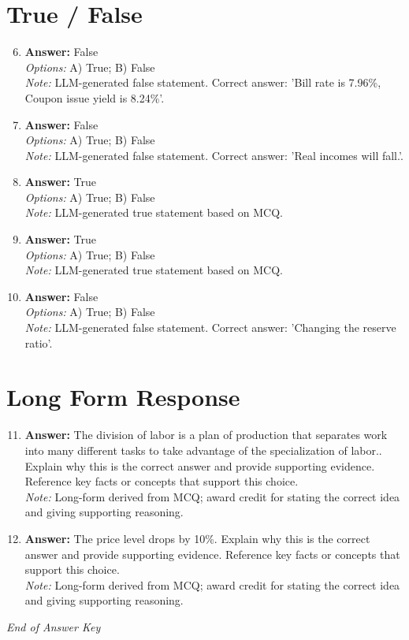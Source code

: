 \documentclass[12pt]{article}
\begin{document}
\section*{True / False}
\begin{enumerate}[label=\arabic*.]
\setcounter{enumi}{5}
\item \textbf{Answer:} False
\\ \textit{Options:} A) True; B) False
\\ \textit{Note:} LLM-generated false statement. Correct answer: 'Bill rate is 7.96\%, Coupon issue yield is 8.24\%'.
\item \textbf{Answer:} False
\\ \textit{Options:} A) True; B) False
\\ \textit{Note:} LLM-generated false statement. Correct answer: 'Real incomes will fall.'.
\item \textbf{Answer:} True
\\ \textit{Options:} A) True; B) False
\\ \textit{Note:} LLM-generated true statement based on MCQ.
\item \textbf{Answer:} True
\\ \textit{Options:} A) True; B) False
\\ \textit{Note:} LLM-generated true statement based on MCQ.
\item \textbf{Answer:} False
\\ \textit{Options:} A) True; B) False
\\ \textit{Note:} LLM-generated false statement. Correct answer: 'Changing the reserve ratio'.
\end{enumerate}

\section*{Long Form Response}
\begin{enumerate}[label=\arabic*.]
\setcounter{enumi}{10}
\item \textbf{Answer:} The division of labor is a plan of production that separates work into many different tasks to take advantage of the specialization of labor.. Explain why this is the correct answer and provide supporting evidence. Reference key facts or concepts that support this choice.
\\ \textit{Note:} Long-form derived from MCQ; award credit for stating the correct idea and giving supporting reasoning.
\item \textbf{Answer:} The price level drops by 10\%. Explain why this is the correct answer and provide supporting evidence. Reference key facts or concepts that support this choice.
\\ \textit{Note:} Long-form derived from MCQ; award credit for stating the correct idea and giving supporting reasoning.
\end{enumerate}

\vfill
\noindent\textit{End of Answer Key}
\end{document}
